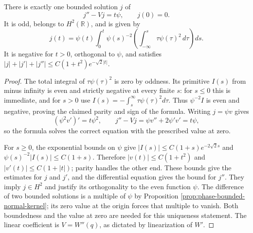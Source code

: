 \begin{lemma}\label{lem:phase-normal-curvature-corrector}
There is exactly one bounded solution $j$ of
\[
 j''-Vj=t\psi,\qquad j(0)=0.
\]
It is odd, belongs to $H^2(\mathbb R)$, and is given by
\[
 j(t)=\psi(t)\int_0^t\psi(s)^{-2}
       \left(\int_{-\infty}^s\tau\psi(\tau)^2\,d\tau\right)ds.
\]
It is negative for $t>0$, orthogonal to $\psi$, and satisfies
$|j|+|j'|+|j''|\leq C(1+t^2)e^{-\sqrt2|t|}$.
\end{lemma}
\begin{proof}
The total integral of $\tau\psi(\tau)^2$ is zero by oddness. Its primitive $I(s)$ from minus infinity is even and strictly negative at every finite $s$: for $s\leq0$ this is immediate, and for $s>0$ use $I(s)=-\int_s^\infty\tau\psi(\tau)^2d\tau$. Thus $\psi^{-2}I$ is even and negative, proving the claimed parity and sign of the formula. Writing $j=\psi v$ gives
\[
 (\psi^2v')'=t\psi^2,\qquad j''-Vj=\psi v''+2\psi'v'=t\psi,
\]
so the formula solves the correct equation with the prescribed value at zero.

For $s\geq0$, the exponential bounds on $\psi$ give
$|I(s)|\leq C(1+s)e^{-2\sqrt2s}$ and $\psi(s)^{-2}|I(s)|\leq C(1+s)$. Therefore $|v(t)|\leq C(1+t^2)$ and $|v'(t)|\leq C(1+|t|)$; parity handles the other end. These bounds give the estimates for $j$ and $j'$, and the differential equation gives the bound for $j''$. They imply $j\in H^2$ and justify its orthogonality to the even function $\psi$. The difference of two bounded solutions is a multiple of $\psi$ by Proposition \ref{prop:phase-bounded-normal-kernel}; its zero value at the origin forces that multiple to vanish. Both boundedness and the value at zero are needed for this uniqueness statement. The linear coefficient is $V=W''(q)$, as dictated by linearization of $W'$.
\end{proof}

